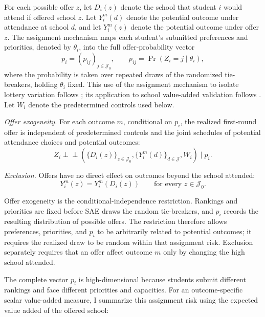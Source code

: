 \documentclass[a4paper, article, english, oneside, unknownkeysallowed, 12pt]{memoir}
\begin{document}
For each possible offer $z$, let $D_i(z)$ denote the school that student $i$ would attend
if offered school $z$. Let $Y_i^m(d)$ denote the potential outcome under attendance at
school $d$, and let $Y_i^m(z)$ denote the potential outcome under offer $z$. The assignment
mechanism maps each student's submitted preferences and priorities, denoted by $\theta_i$,
into the full offer-probability vector
\[
    p_i=(p_{ij})_{j\in\mathcal J_0},
    \qquad
    p_{ij}=\Pr(Z_i=j\mid\theta_i),
\]
where the probability is taken over repeated draws of the randomized tie-breakers, holding
$\theta_i$ fixed. This use of the assignment mechanism to isolate lottery variation follows
\textcite{abdulkadiroglu_research_2017}; its application to school value-added validation
follows \textcite{angrist_methods_2023}. Let $W_i$ denote the predetermined controls used below.

\begin{assumption}
\label{ass:lottery}

\textit{Offer exogeneity.} For each outcome $m$, conditional on $p_i$, the realized first-round offer is independent
of predetermined controls and the joint schedules of potential attendance choices and
potential outcomes:
\[
    Z_i
    \perp\!\!\!\perp
    \left(
        \{D_i(z)\}_{z\in\mathcal J_0},
        \{Y_i^m(d)\}_{d\in\mathcal J},
        W_i
    \right)
    \mid p_i .
\]

\textit{Exclusion.} Offers have no direct effect on outcomes beyond the school attended:
\[
    Y_i^m(z)=Y_i^m\!\left(D_i(z)\right)
    \qquad
    \text{for every }z\in\mathcal J_0.
\]
\end{assumption}

Offer exogeneity is the conditional-independence restriction. Rankings and priorities are
fixed before SAE draws the random tie-breakers, and $p_i$ records the resulting distribution
of possible offers. The restriction therefore allows preferences, priorities, and $p_i$ to
be arbitrarily related to potential outcomes; it requires the realized draw to be random
within that assignment risk. Exclusion separately requires that an offer affect outcome $m$
only by changing the high school attended.

The complete vector $p_i$ is high-dimensional because students submit different rankings
and face different priorities and capacities. For an outcome-specific scalar value-added
measure, I summarize this assignment risk using the expected value added of the offered
school:
\end{document}
